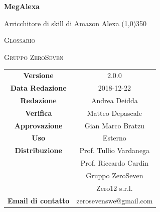 \documentclass[a4paper,12pt]{article}
\author{Mirko Franco}
\date{2018-12-14}
\begin{document}
\begin{titlepage}
	\centering
	{\huge\bfseries MegAlexa\par}
	Arricchitore di skill di Amazon Alexa
	\line(1,0){350} \\
	{\scshape\LARGE Glossario \par}
	\vspace{1cm}
	{\scshape Gruppo ZeroSeven \par}
	\logo
		\begin{tabular}{c|c}
		{\hfill \textbf{Versione}} 			& 2.0.0				\\
		{\hfill\textbf{Data Redazione}} 	& 2018-12-22		\\ 
		{\hfill\textbf{Redazione}} 			& Andrea Deidda			\\ 
		{\hfill\textbf{Verifica}} 				&  	Matteo Depascale				\\ 
		{\hfill\textbf{Approvazione}} 		&  		Gian Marco Bratzu			\\ 
		{\hfill\textbf{Uso}} 					& 		Esterno		\\ 
		{\hfill\textbf{Distribuzione}} 			& 			Prof. Tullio Vardanega \\ & Prof. Riccardo Cardin \\ & Gruppo ZeroSeven		\\ & Zero12 s.r.l. \\
		{\hfill\textbf{Email di contatto}} & zerosevenswe@gmail.com \\
	\end{tabular}
\end{titlepage}

	\label{LastFrontPage}
	\newpage	
	
	\glsaddall
	\pagestyle{mymain}
	\printnoidxglossaries
	\label{LastPage}
	
	
\end{document}
